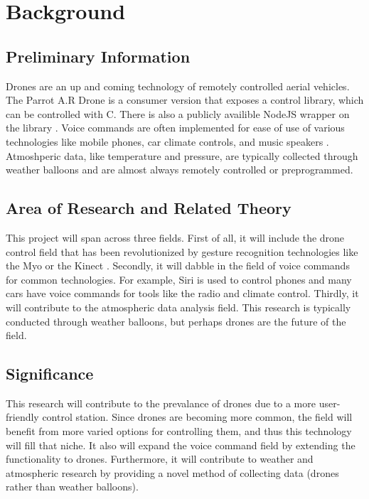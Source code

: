 \documentclass{article}
\begin{document}
	\section{Background}
	\subsection{Preliminary Information}
	Drones are an up and coming technology of remotely controlled aerial vehicles. The Parrot A.R Drone is a consumer version that exposes a control library, which can be controlled with C. There is also a publicly availible NodeJS wrapper on the library \cite{droneapi}. Voice commands are often implemented for ease of use of various technologies like mobile phones, car climate controls, and music speakers \cite{sphinx}. Atmoshperic data, like temperature and pressure, are typically collected through weather balloons and are almost always remotely controlled or preprogrammed. 
	\subsection{Area of Research and Related Theory}
	This project will span across three fields. First of all, it will include the drone control field that has been revolutionized by gesture recognition technologies like the Myo \cite{myo} or the Kinect \cite{kinect}. Secondly, it will dabble in the field of voice commands for common technologies. For example, Siri is used to control phones and many cars have voice commands for tools like the radio and climate control. Thirdly, it will contribute to the atmospheric data analysis field. This research is typically conducted through weather balloons, but perhaps drones are the future of the field. 
	\subsection{Significance}
	This research will contribute to the prevalance of drones due to a more user-friendly control station. Since drones are becoming more common, the field will benefit from more varied options for controlling them, and thus this technology will fill that niche. It also will expand the voice command field by extending the functionality to drones. Furthermore, it will contribute to weather and atmospheric research by providing a novel method of collecting data (drones rather than weather balloons). 
\end{document}
